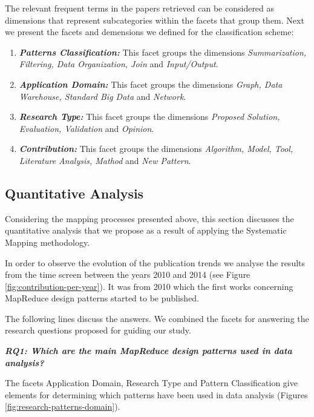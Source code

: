 The relevant frequent terms in the papers retrieved can be considered as
dimensions that represent subcategories within the facets that group them. Next
we present the facets and demensions we defined for the classification scheme: 
  
\begin{enumerate}
\item \textbf{\textit{Patterns Classification:}} This facet groups the
dimensions \textit{Summarization, Filtering, Data Organization, Join} and \textit{Input/Output}.

\item \textbf{\textit{Application Domain:}} This facet groups the dimensions
\textit{Graph, Data Warehouse, Standard Big Data} and \textit{Network}.

\item \textbf{\textit{Research Type:}} This facet groups the dimensions
\textit{Proposed Solution, Evaluation, Validation} and \textit{Opinion}.

\item \textbf{\textit{Contribution:}} This facet groups the dimensions
\textit{Algorithm, Model, Tool, Literature Analysis, Mathod} and \textit{New Pattern}.

\end{enumerate}
 
\subsection{Quantitative Analysis}

Considering the mapping processes presented above, this
section discusses the quantitative analysis that we propose as a result of
applying the Systematic Mapping methodology.  

In order to observe the evolution of the publication trends we analyse the
results from the time screen between the years 2010 and 2014 (see Figure
\ref{fig:contribution-per-year}). It was from 2010 which the first works
concerning MapReduce design patterns started to be published.         

The following lines discuss the answers. We combined the facets for answering
the research questions proposed for guiding our study. 

\bigskip
\textbf{\textit{RQ1: Which are the main MapReduce design patterns used in data
analysis?}} 
    
The facets Application Domain, Research Type and Pattern Classification give
elements for determining which patterns have been used in data analysis (Figures
\ref{fig:research-patterns-domain}). 

